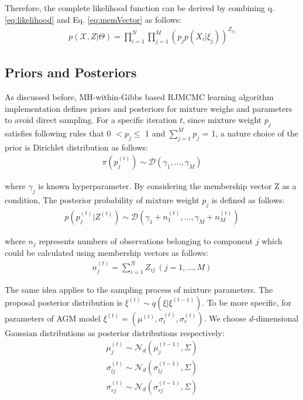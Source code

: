 \documentclass[conference]{IEEEtran}
\begin{document}
Therefore, the complete likelihood function can be derived by combining q. \eqref{eq:likelihood} and Eq. \eqref{eq:memVector} as follows:
\begin{align}
p(\mathcal{X}, Z|\Theta) = \prod_{i=1}^{N}\prod_{j=1}^{M}(p_jp(X_i|\xi_j))^{Z_{ij}}
\label{eq:compPdf}
\end{align}

\subsection{Priors and Posteriors}
As discussed before, MH-within-Gibbs based RJMCMC learning algorithm implementation defines priors and posteriors for mixture weighs and parameters to avoid direct sampling. For a specific iteration $t$, since mixture weight $p_j$ satisfies following rules that 0 $< p_j \leq$ 1 and $\sum_{j=1}^Mp_j$ = 1, a nature choice of the prior is Dirichlet distribution\cite{b10} as follows:
\begin{align}
\pi(p_j^{(t)}) \sim \mathcal{D}(\gamma_1,...,\gamma_M )
\label{eq:priorWeight}
\end{align}

where $\gamma_j$ is known hyperparameter. By considering the membership vector Z as a condition, The posterior probability of mixture weight $p_j$ is defined as follows:
\begin{align}
p(p_j^{(t)}|Z^{(t)}) \sim \mathcal{D}(\gamma_1 + n_1^{(t)},...,\gamma_M + n_M^{(t)})
\label{eq:posterWeight}
\end{align}

where $n_j$ represents numbers of observations belonging to component $j$ which could be calculated using membership vectors as follows:
\begin{align}
n_j^{(t)} = \sum_{i=1}^NZ_{ij}\ (j = 1,...,M) 
\label{eq:nj}
\end{align}

The same idea applies to the sampling process of mixture parameters. The proposal posterior distribution is  $\xi^{(t)} \sim q(\xi|\xi^{(t-1)})$. To be more specific, for parameters of AGM model $\xi^{(t)} = (\mu^{(t)}, \sigma_{l}^{(t)}, \sigma_{r}^{(t)})$. We choose $d$-dimensional Gaussian distributions as posterior distributions respectively:
\begin{align}
\mu_j^{(t)} \sim \mathcal{N}_d(\mu_j^{(t-1)},\Sigma)
\label{eq:posterMu}
\end{align}
\begin{align}
\sigma_{lj}^{(t)} \sim \mathcal{N}_d(\sigma_{lj}^{(t-1)},\Sigma)
\label{eq:posterSigmal}
\end{align}
\begin{align}
\sigma_{rj}^{(t)} \sim \mathcal{N}_d(\sigma_{rj}^{(t-1)},\Sigma)
\label{eq:posterSigmaR}
\end{align}
\end{document}
